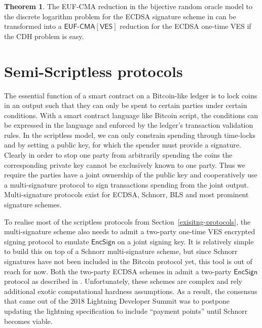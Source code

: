 \documentclass[fullpage]{article}
\theoremstyle{definition}
\newtheorem{theorem}{Theorem}[section]
\newcommand{\EUFCMA}{\textsf{EUF-CMA}\xspace}
\newcommand{\EUFCMAVES}{\textsf{EUF-CMA}[\textsf{VES}]\xspace}
\newcommand{\EncSign}{\textsf{EncSign}}
\newcommand{\hatsigma}{\hat{\sigma}}
\begin{document}
\begin{theorem}
\label{claim-ecdsa-eufcma}
The \EUFCMA reduction in the bijective random oracle model to the discrete logarithm problem for the ECDSA signature scheme in \cite{ecdsa-eufcma} can be transformed into a $\EUFCMAVES$ reduction for the ECDSA one-time VES if the CDH problem is easy.
\end{theorem}

\section{Semi-Scriptless protocols}
\label{semi-scriptless}

\newcommand{\TxFund}{\texttt{Tx}_{\textsf{fund}}}
\newcommand{\TxRefund}{\texttt{Tx}_{\textsf{refund}}}
\newcommand{\TxRedeem}{\texttt{Tx}_{\textsf{redeem}}}
\newcommand{\TxInput}{\texttt{Tx}_{\textsf{input}}}
\newcommand{\addrRedeem}{addr_{B}}
\newcommand{\addrRefund}{addr_{A}}
\newcommand{\TxGen}{\textsf{Tx}}
\newcommand{\refundSig}{\sigma_{\textsf{refund}}}
\newcommand{\redeemSig}{\sigma_{\textsf{redeem}}}
\newcommand{\redeemEncSig}{\hatsigma_{\textsf{redeem}}}

The essential function of a smart contract on a Bitcoin-like ledger is to lock coins in an output such that they can only be spent to certain parties under certain conditions. With a smart contract language like Bitcoin script, the conditions can be expressed in the language and enforced by the ledger's transaction validation rules. In the scriptless model, we can only constrain spending through time-locks and by setting a public key, for which the spender must provide a signature. Clearly in order to stop one party from arbitrarily spending the coins the corresponding private key cannot be exclusively known to one party. Thus we require the parties have a joint ownership of the public key and cooperatively use a multi-signature protocol to sign transactions spending from the joint output. Multi-signature protocols exist for ECDSA\cite{Lindell2pECDSA,hash-proof-ecdsa}, Schnorr\cite{musig}, BLS\cite{compact-blockchains-bls} and most prominent signature schemes.

To realise most of the scriptless protocols from Section~\ref{exisitng-protocols}, the multi-signature scheme also needs to admit a two-party one-time VES encrypted signing protocol to emulate $\EncSign$ on a joint signing key. It is relatively simple to build this on top of a Schnorr multi-signature scheme, but since Schnorr signatures have not been included in the Bitcoin protocol yet, this tool is out of reach for now. Both the two-party ECDSA schemes in \cite{Lindell2pECDSA,hash-proof-ecdsa} admit a two-party $\EncSign$ protocol as described in \cite{ecdsa-scriptless-scripts}. Unfortunately, these schemes are complex and rely additional exotic computational hardness assumptions. As a result, the consensus that came out of the 2018 Lightning Developer Summit was to postpone updating the lightning specification to include ``payment points'' until Schnorr becomes viable.\cite{zmn-2pecdsa}
\end{document}
